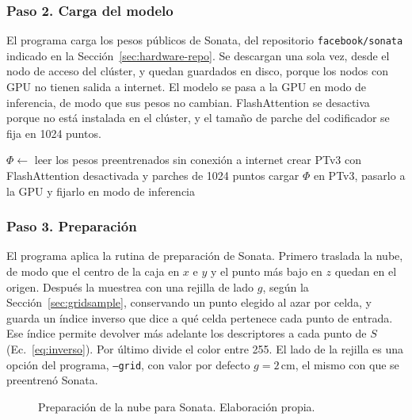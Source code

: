 \FloatBarrier
\subsubsection*{Paso 2. Carga del modelo}
\label{sec:u2-p2}

El programa carga los pesos públicos de Sonata, del repositorio
\texttt{facebook/sonata} indicado en la Sección~\ref{sec:hardware-repo}. Se
descargan una sola vez, desde
el nodo de acceso del clúster, y quedan guardados en disco, porque los nodos con
GPU no tienen salida a internet. El modelo se pasa a la GPU en modo de
inferencia, de modo que sus pesos no cambian. FlashAttention se desactiva porque
no está instalada en el clúster, y el tamaño de parche del codificador se fija
en 1024 puntos.

\begin{algorithm}[H]
\small
\caption{Paso 2 del Módulo~3, carga del modelo.}
$\Phi \leftarrow$ leer los pesos preentrenados sin conexión a internet\;
crear PTv3 con FlashAttention desactivada y parches de 1024 puntos\;
cargar $\Phi$ en PTv3, pasarlo a la GPU y fijarlo en modo de inferencia\;
\end{algorithm}

\FloatBarrier
\subsubsection*{Paso 3. Preparación}
\label{sec:u2-p3}

El programa aplica la rutina de preparación de Sonata. Primero traslada la nube,
de modo que el centro de la caja en $x$ e $y$ y el punto más bajo en $z$ quedan
en el origen. Después la muestrea con una rejilla de lado $g$, según la
Sección~\ref{sec:gridsample}, conservando un punto elegido al azar por celda, y
guarda un índice inverso que dice a qué celda pertenece cada punto de entrada.
Ese índice permite devolver más adelante los descriptores a cada punto de $S$
(Ec.~\eqref{eq:inverso}). Por último divide el color entre 255. El lado de la
rejilla es una opción del programa, \texttt{--grid}, con valor por defecto
$g=2$\,cm, el mismo con que se preentrenó Sonata.

\begin{figure}[!htbp]
\centering{}
\caption[Preparación de la nube para Sonata]{Preparación de la nube para Sonata. Elaboración propia.}
\end{figure}

